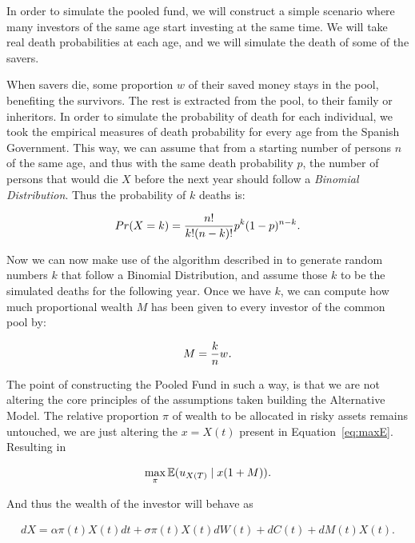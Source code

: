In order to simulate the pooled fund, we will construct a simple scenario where many investors of the same age start investing at the same time. We will take real death probabilities at each age, and we will simulate the death of some of the savers.

When savers die, some proportion $w$ of their saved money stays in the pool, benefiting the survivors. The rest is extracted from the pool, to their family or inheritors. In order to simulate the probability of death for each individual, we took the empirical measures of death probability for every age from the Spanish Government. This way, we can assume that from a starting number of persons $n$ of the same age, and thus with the same death probability $p$, the number of persons that would die $X$ before the next year should follow a \emph{Binomial Distribution}. Thus the probability of $k$ deaths is:

\begin{align}
  Pr(X = k) = \frac{n!}{k!(n-k)!} p^k (1-p)^{n-k} \emph{.}
\end{align}

Now we can now make use of the algorithm described in \cite{a:schmeiser-binomial} to generate random numbers $k$ that follow a Binomial Distribution, and assume those $k$ to be the simulated deaths for the following year. Once we have $k$, we can compute how much proportional wealth $M$ has been given to every investor of the common pool by:

\begin{align}
  M = \frac{k}{n}w \emph{.}
\end{align}

The point of constructing the Pooled Fund in such a way, is that we are not altering the core principles of the assumptions taken building the Alternative Model. The relative proportion $\pi$ of wealth to be allocated in risky assets remains untouched, we are just altering the $x = X(t)$ present in  Equation~\ref{eq:maxE}. Resulting in

\begin{align}
	\max_{\pi}\EX\giventhat{u_{X(T)}}{x(1 + M)} \emph{.}
\end{align}

And thus the wealth of the investor will behave as

\begin{align}
	dX = \alpha \pi(t)X(t)dt + \sigma \pi(t)X(t)dW(t) + dC(t) + dM(t)X(t) \textit{.}
\end{align}

